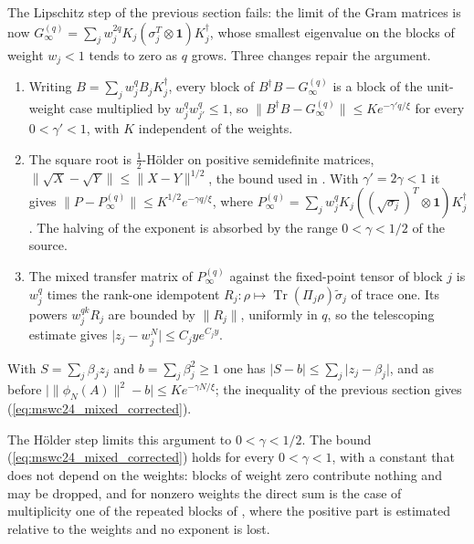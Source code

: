 \documentclass{article}
\begin{document}
The Lipschitz step of the previous section fails: the limit of the Gram matrices is now
$G_\infty^{(q)}=\sum_jw_j^{2q}K_j(\sigma_j^T\otimes\mathbf 1)K_j^\dagger$, whose smallest
eigenvalue on the blocks of weight $w_j<1$ tends to zero as $q$ grows. Three changes repair the
argument.
\begin{enumerate}
    \item Writing $B=\sum_jw_j^qB_jK_j^\dagger$, every block of $B^\dagger B-G_\infty^{(q)}$ is a
          block of the unit-weight case multiplied by $w_j^qw_{j'}^q\leq1$, so
          $\lVert B^\dagger B-G_\infty^{(q)}\rVert\leq Ke^{-\gamma'q/\xi}$ for every
          $0<\gamma'<1$, with $K$ independent of the weights.
    \item The square root is $\tfrac12$-Hölder on positive semidefinite matrices,
          $\lVert\sqrt X-\sqrt Y\rVert\leq\lVert X-Y\rVert^{1/2}$, the bound used in
          \cite[Supplemental Material, eq.~(26)]{Piroli2021LOCC}. With $\gamma'=2\gamma<1$ it gives
          $\lVert P-P_\infty^{(q)}\rVert\leq K^{1/2}e^{-\gamma q/\xi}$, where
          $P_\infty^{(q)}=\sum_jw_j^qK_j((\sqrt{\sigma_j})^T\otimes\mathbf 1)K_j^\dagger$. The
          halving of the exponent is absorbed by the range $0<\gamma<1/2$ of the source.
    \item The mixed transfer matrix of $P_\infty^{(q)}$ against the fixed-point tensor of block
          $j$ is $w_j^q$ times the rank-one idempotent $R_j:\rho\mapsto\operatorname{Tr}(\Pi_j\rho)
              \tilde\sigma_j$ of trace one. Its powers $w_j^{qk}R_j$ are bounded by
          $\lVert R_j\rVert$, uniformly in $q$, so the telescoping estimate gives
          $\lvert z_j-w_j^N\rvert\leq C_jye^{C_jy}$.
\end{enumerate}
With $S=\sum_j\beta_jz_j$ and $b=\sum_j\beta_j^2\geq1$ one has
$\lvert S-b\rvert\leq\sum_j\lvert z_j-\beta_j\rvert$, and as before
$\bigl\lvert\lVert\phi_N(A)\rVert^2-b\bigr\rvert\leq Ke^{-\gamma N/\xi}$; the inequality of the
previous section gives (\ref{eq:mswc24_mixed_corrected}).

The Hölder step limits this argument to $0<\gamma<1/2$. The bound
(\ref{eq:mswc24_mixed_corrected}) holds for every $0<\gamma<1$, with a constant that does not
depend on the weights: blocks of weight zero contribute nothing and may be dropped, and for
nonzero weights the direct sum is the case of multiplicity one of the repeated blocks of
\cite{gap:mswc24_repeated_overlap_small_weight_sum}, where the positive part is estimated
relative to the weights and no exponent is lost.
\end{document}
